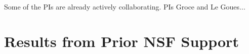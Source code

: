 \documentclass[numbers]{proposalnsf}
\begin{document}
Some of the PIs are already actively collaborating.
PIs Groce and Le Goues...





\section{Results from Prior NSF Support}




\newpage
%


\end{document}
